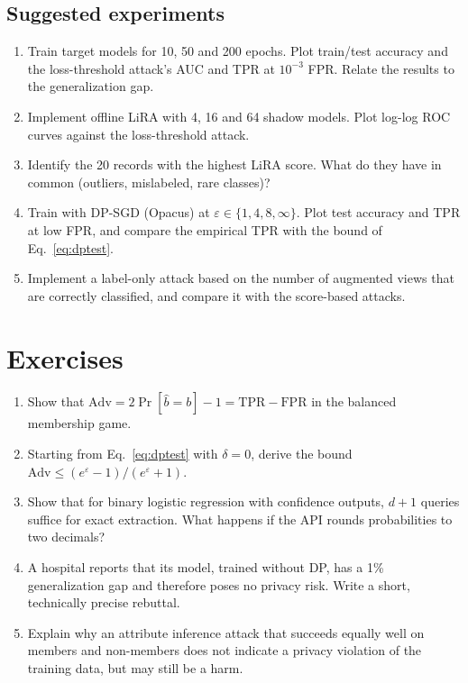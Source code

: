 \documentclass[10pt,a4paper]{extarticle}
\theoremstyle{definition}
\begin{document}
\subsection{Suggested experiments}

\begin{enumerate}[label=\textbf{\arabic*.}]
  \item Train target models for 10, 50 and 200 epochs. Plot train/test accuracy and the loss-threshold attack's AUC and TPR at \(10^{-3}\) FPR. Relate the results to the generalization gap.
  \item Implement offline LiRA with 4, 16 and 64 shadow models. Plot log-log ROC curves against the loss-threshold attack.
  \item Identify the 20 records with the highest LiRA score. What do they have in common (outliers, mislabeled, rare classes)?
  \item Train with DP-SGD (Opacus) at \(\varepsilon\in\{1,4,8,\infty\}\). Plot test accuracy and TPR at low FPR, and compare the empirical TPR with the bound of Eq.~\eqref{eq:dptest}.
  \item Implement a label-only attack based on the number of augmented views that are correctly classified, and compare it with the score-based attacks.
\end{enumerate}

\section*{Exercises}

\begin{enumerate}[label=\textbf{\arabic*.}]
  \item Show that \(\mathrm{Adv}=2\Pr[\hat b=b]-1=\mathrm{TPR}-\mathrm{FPR}\) in the balanced membership game.
  \item Starting from Eq.~\eqref{eq:dptest} with \(\delta=0\), derive the bound \(\mathrm{Adv}\le(e^{\varepsilon}-1)/(e^{\varepsilon}+1)\).
  \item Show that for binary logistic regression with confidence outputs, \(d+1\) queries suffice for exact extraction. What happens if the API rounds probabilities to two decimals?
  \item A hospital reports that its model, trained without DP, has a 1\% generalization gap and therefore poses no privacy risk. Write a short, technically precise rebuttal.
  \item Explain why an attribute inference attack that succeeds equally well on members and non-members does not indicate a privacy violation of the training data, but may still be a harm.
\end{enumerate}



\end{document}
